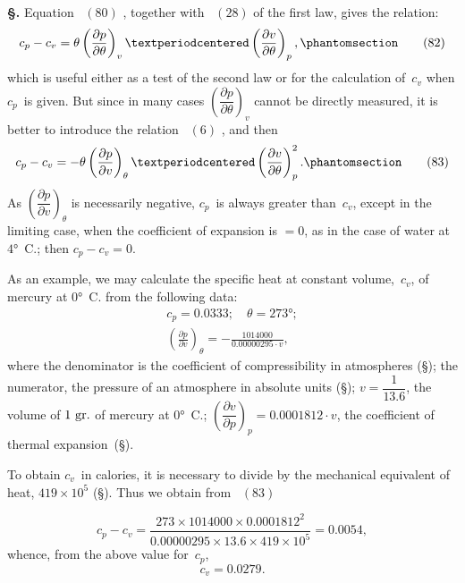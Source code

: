 \documentclass[12pt]{book}[2005/09/16]
\newcommand{\Chg}[2]{#2}
\newcommand{\Add}[1]{\Chg{}{#1}}
\newcommand{\Section}[1]{
  \medskip\par\textbf{§\;#1}
  \label{section:#1}
}
\newcommand{\SecRef}[2][§\;]{\hyperref[section:#2.]{{\upshape #1#2}}}
\newcommand{\Tag}[1]{%
  \phantomsection\label{eqn:#1}\tag*{\ensuremath{#1}}%
}
\newcommand{\Eq}[1]{%
  \hyperref[eqn:#1]{\ensuremath{#1}}%
}
\newcommand{\PageSep}[1]{\ignorespaces}
\newcommand{\dd}{\partial}
\newcommand{\Unit}[1]{\text{\upshape #1}}
\begin{document}
\Section{154.} Equation~\Eq{(80)}, together with~\Eq{(28)} of the first
law, gives the relation:
\[
c_{p} - c_{v} = \theta \left(\frac{\dd p}{\dd \theta}\right)_{v} · \left(\frac{\dd v}{\dd \theta}\right)_{p}\Add{,}
\Tag{(82)}
\]
which is useful either as a test of the second law or for the
calculation of~$c_{v}$ when $c_{p}$~is given. But since in many cases
$\left(\dfrac{\dd p}{\dd \theta}\right)_{v}$ cannot be directly measured, it is better to introduce
the relation~\Eq{(6)}, and then
\[
c_{p} - c_{v} = -\theta \left(\frac{\dd p}{\dd v}\right)_{\theta} · \left(\frac{\dd v}{\dd \theta}\right)_{p}^{2}\Add{.}
\Tag{(83)}
\]
As $\left(\dfrac{\dd p}{\dd v}\right)_{\theta}$ is necessarily negative, $c_{p}$~is always greater than~$c_{v}$,
except in the limiting case, when the coefficient of expansion
is $= 0$, as in the case of water at $4°$~C.\Chg{,}{}; then $c_{p} - c_{v} = 0$.

As an example, we may calculate the specific heat at
%
%
constant volume,~$c_{v}$, of mercury at $0°$~C. from the following
data:
\begin{gather*}
c_{p} = 0.0333;\quad \theta = 273°; \\
\left(\frac{\dd p}{\dd v}\right)_{\theta} = -\frac{1014000}{0.00000295 · v},
\end{gather*}
\PageSep{121}
where the denominator is the coefficient of compressibility
in atmospheres (\SecRef{15}); the numerator, the pressure of an
atmosphere in absolute units (\SecRef{17}); $v = \dfrac{1}{13.6}$, the volume
of $1~\Unit{gr.}$ of mercury at $0°$~C.; $\left(\dfrac{\dd v}{\dd p}\right)_{p} = 0.0001812 · v$, the
coefficient of thermal expansion~(\SecRef{15}).

To obtain $c_{v}$~in calories, it is necessary to divide by the
mechanical equivalent of heat, $419 × 10^{5}$ (\SecRef{61}). Thus we
obtain from~\Eq{(83)}
\[
c_{p} - c_{v} = \frac{273 × 1014000 × 0.0001812^{2}}
                    {0.00000295 × 13.6 × 419 × 10^{5}}
  = 0.0054,
\]
whence, from the above value for~$c_{p}$,
\[
c_{v} = 0.0279.
\]
\end{document}
